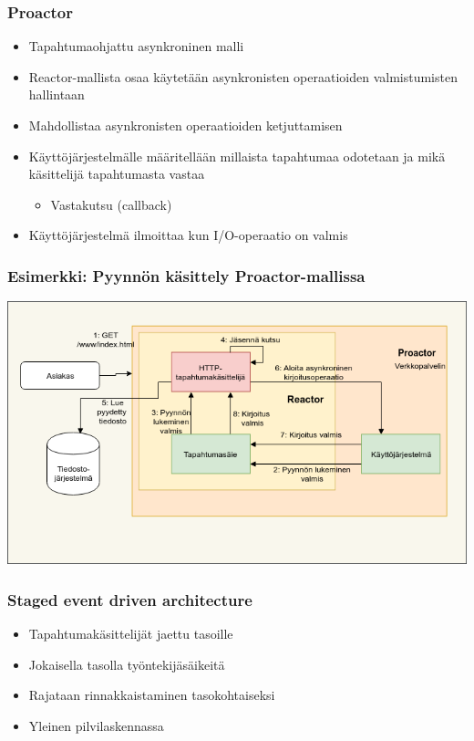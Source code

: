 \documentclass{beamer}
\begin{document}
\begin{frame}
    \frametitle{Proactor}
    \begin{itemize}
        \item Tapahtumaohjattu asynkroninen malli
        \item Reactor-mallista osaa käytetään asynkronisten
            operaatioiden valmistumisten hallintaan
        \item Mahdollistaa asynkronisten operaatioiden ketjuttamisen
        \item Käyttöjärjestelmälle määritellään millaista tapahtumaa
            odotetaan ja mikä käsittelijä tapahtumasta vastaa
            \begin{itemize}
                \item Vastakutsu (callback)
            \end{itemize}
        \item Käyttöjärjestelmä ilmoittaa kun I/O-operaatio on valmis
    \end{itemize}
\end{frame}
\begin{frame}
    \frametitle{Esimerkki: Pyynnön käsittely Proactor-mallissa}
        \includegraphics[scale=0.5]{Proactor.png}
\end{frame}
\begin{frame}
    \frametitle{Staged event driven architecture}
    \begin{itemize}
        \item Tapahtumakäsittelijät jaettu tasoille
        \item Jokaisella tasolla työntekijäsäikeitä
        \item Rajataan rinnakkaistaminen tasokohtaiseksi
        \item Yleinen pilvilaskennassa
    \end{itemize}
\end{frame}
\end{document}
